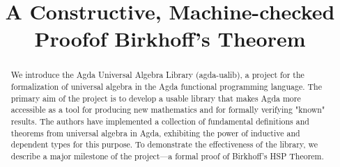 \documentclass[sigplan,screen]{acmart}
\begin{document}
\title{A Constructive, Machine-checked Proof\break of Birkhoff's Theorem}

\author{}

\begin{abstract}
We introduce the Agda Universal Algebra Library (agda-ualib), a project for the formalization of universal algebra in the Agda functional programming language. The primary aim of the project is to develop a usable library that makes Agda more accessible as a tool for producing new mathematics and for formally verifying "known" results.  The authors have implemented a collection of fundamental definitions and theorems from universal algebra in Agda, exhibiting the power of inductive and dependent types for this purpose.  To demonstrate the effectiveness of the library, we describe a major milestone of the project---a formal proof of Birkhoff's HSP Theorem.
\end{abstract}
\end{document}
